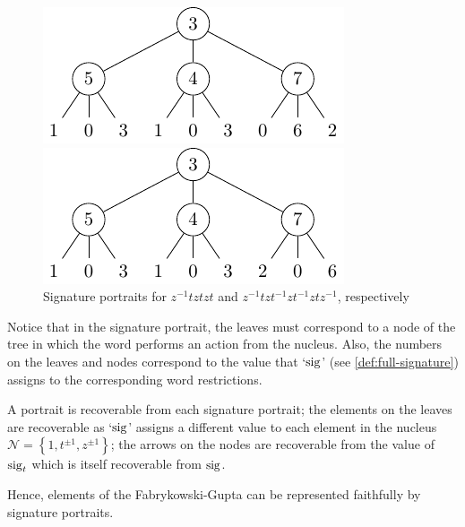 \begin{figure}[!ht]
\begin{center}
	
	\hfill
	\begin{minipage}{.45\linewidth}
		\centering
		\includegraphics[width=\linewidth]{figures/portraits/ZtztztSigPortrait}
	\end{minipage}
	\hfill
	\begin{minipage}{.45\linewidth}
		\centering
		\includegraphics[width=\linewidth]{figures/portraits/ZtzTzTztZSigPortrait}
	\end{minipage}
	\hfill
	
\end{center}
\caption{Signature portraits for $z^{-1}tztzt$ and $z^{-1}tzt^{-1}zt^{-1}ztz^{-1}$, respectively}
	\label{fig:port4}
\end{figure}



Notice that in the signature portrait, the leaves must correspond to a node of the tree in which the word performs an action from the nucleus.
Also, the numbers on the leaves and nodes correspond to the value that `$\operatorname{sig}$' (see \cref{def:full-signature}) assigns to the corresponding word restrictions.

\begin{remark}
	A portrait is recoverable from each signature portrait; the elements on the leaves are recoverable as `$\operatorname{sig}$' assigns a different value to each element in the nucleus $\mathcal{N} = \left\lbrace 1,t^{\pm 1}, z^{\pm 1}\right\rbrace$; the arrows on the nodes are recoverable from the value of $\operatorname{sig}_t$ which is itself recoverable from  $\operatorname{sig}$.
	
	Hence, elements of the Fabrykowski-Gupta can be represented faithfully by signature portraits.
	\thmendmark
\end{remark}

